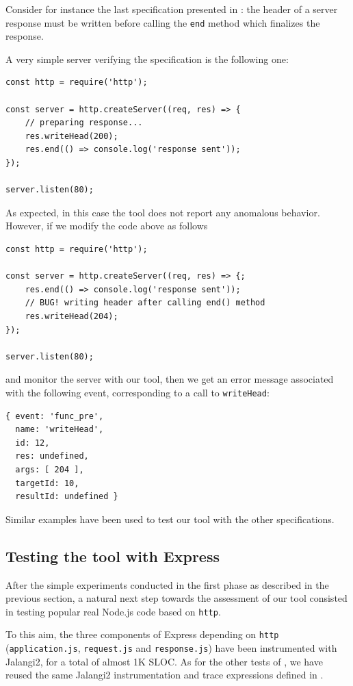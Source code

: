 Consider for instance the last specification presented in : 
the header of a server response must be written before calling the \lstinline{end} method which finalizes the response.

A very simple server verifying the specification is the following one:
\begin{lstlisting}
const http = require('http');

const server = http.createServer((req, res) => {
	// preparing response...
	res.writeHead(200);
	res.end(() => console.log('response sent'));
});

server.listen(80);
\end{lstlisting}

As expected, in this case the tool does not report any anomalous behavior.
However, if we modify the code above as follows
\begin{lstlisting}
const http = require('http');

const server = http.createServer((req, res) => {;
	res.end(() => console.log('response sent'));
	// BUG! writing header after calling end() method
	res.writeHead(204);
});

server.listen(80);
\end{lstlisting}
and monitor the server with our tool, then we get an error message associated with the following event, corresponding
to a call to \lstinline{writeHead}:
\begin{lstlisting}
{ event: 'func_pre',
  name: 'writeHead',
  id: 12,
  res: undefined,
  args: [ 204 ],
  targetId: 10,
  resultId: undefined }
\end{lstlisting}

Similar examples have been used to test our tool with the other specifications.

\subsection{Testing the tool with Express}

After the simple experiments conducted in the first phase as described in the previous section,
a natural next step towards the assessment of our tool consisted in testing popular real Node.js code
based on \lstinline{http}.

To this aim, the three components of Express depending on \lstinline{http} (\lstinline{application.js}, \lstinline{request.js} and
\lstinline{response.js}) have been instrumented with Jalangi2, for a total of almost 1K SLOC.
As for the other tests of , we have reused the same Jalangi2 instrumentation and trace expressions defined in .

